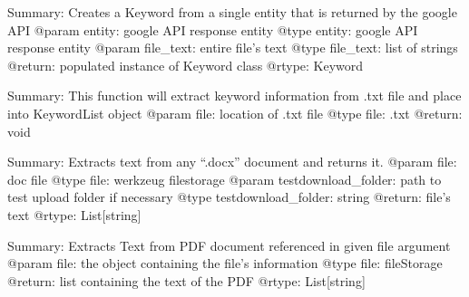 \documentclass[letterpaper,10pt,english]{sphinxmanual}
\begin{document}
\begin{fulllineitems}
\label{\detokenize{functionsv1:common_functions.createkeywordfromgoogleapientity}}
Summary: Creates a Keyword from a single entity that is returned by the google API
@param entity: google API response entity
@type entity: google API response entity
@param file\_text: entire file’s text
@type file\_text: list of strings
@return: populated instance of Keyword class
@rtype: Keyword

\end{fulllineitems}


\begin{fulllineitems}
\label{\detokenize{functionsv1:common_functions.extractkeywordfromtxt}}
Summary: This function will extract keyword information from .txt file and place into KeywordList object
@param file: location of .txt file
@type file: .txt
@return: void

\end{fulllineitems}


\begin{fulllineitems}
\label{\detokenize{functionsv1:common_functions.extractmicrosoftdocxtext}}
Summary: Extracts text from any “.docx” document and returns it.
@param file: doc file
@type file: werkzeug filestorage
@param testdownload\_folder: path to test upload folder if necessary
@type testdownload\_folder: string
@return: file’s text
@rtype: List{[}string{]}

\end{fulllineitems}


\begin{fulllineitems}
\label{\detokenize{functionsv1:common_functions.extractpdftext}}
Summary: Extracts Text from PDF document referenced in given file argument
@param file: the object containing the file’s information
@type file: fileStorage
@return: list containing the text of the PDF
@rtype: List{[}string{]}

\end{fulllineitems}
\end{document}
